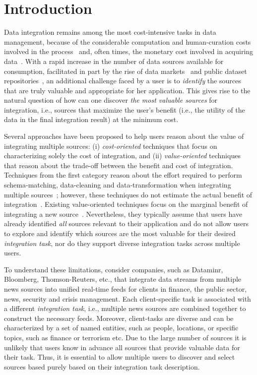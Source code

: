 \documentclass{sig-alternate-05-2015}
\begin{document}
\section{Introduction}
\label{sec:intro}
Data integration remains among the most cost-intensive tasks in data management, because of the considerable computation and human-curation costs involved in the process~\cite{kruse2015estimating} and, often times, the monetary cost involved in acquiring data~\cite{balazinska:vldb11}. With a rapid increase in the number of data sources available for consumption, facilitated in part by the rise of data markets~\cite{balazinska:vldb11} and public dataset repositories~\cite{datahub}, an additional challenge faced by a user is to {\em identify} the sources that are truly valuable and appropriate for her application. This gives rise to the natural question of how can one discover {\em the most valuable sources} for integration, i.e., sources that maximize the user's benefit (i.e., the utility of the data in the final integration result) at the minimum cost. 

Several approaches have been proposed to help users reason about the value of integrating multiple sources: (i) {\em cost-oriented} techniques that focus on characterizing solely the cost of integration, and (ii) {\em value-oriented} techniques that reason about the trade-off between the benefit and cost of integration. Techniques from the first category reason about the effort required to perform schema-matching, data-cleaning and data-transformation when integrating multiple sources~\cite{kruse2015estimating}; however, these techniques do not estimate the actual benefit of integration~\cite{rekatsinas:2015}. Existing value-oriented techniques focus on the marginal benefit of integrating a new source~\cite{dong:vldb13,rekatsinas:2014}. Nevertheless, they typically assume that users have already identified {\em all} sources relevant to their application and do not allow users to explore and identify which sources are the most valuable for their desired {\em integration task}, nor do they support diverse integration tasks across multiple users.

To understand these limitations, consider companies, such as Dataminr, Bloomberg, Thomson-Reuters, etc., that integrate data streams from multiple news sources into unified real-time feeds for clients in finance, the public sector, news, security and crisis management. Each client-specific task is associated with a different {\em integration task}, i.e., multiple news sources are combined together to construct the necessary feeds. Moreover, client-tasks are diverse and can be characterized by a set of named entities, such as people, locations, or specific topics, such as finance or terrorism etc. Due to the large number of sources it is unlikely that users know in advance all sources that provide valuable data for their task. Thus, it is essential to allow multiple users to discover and select sources based purely based on their integration task description. 
\end{document}
